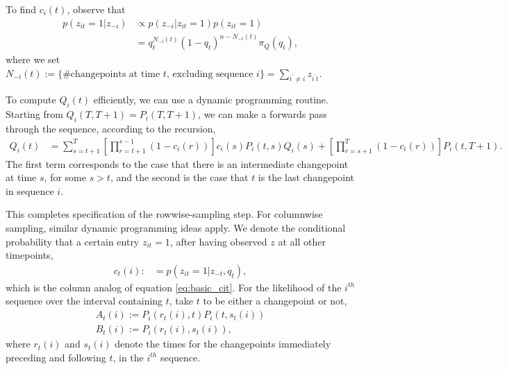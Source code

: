 \documentclass[14pt]{extarticle}
\begin{document}
To find $c_{i}\left(t\right)$, observe that
\begin{align*}
  p\left(z_{it} = 1 \vert z_{-i}\right) &\propto p\left(z_{-i} \vert z_{it} = 1\right) p\left(z_{it} = 1\right) \\
  &= q_{t}^{N_{-i}\left(t\right)} \left(1 - q_{t}\right)^{n - N_{-i}\left(t\right)} \pi_{Q}\left(q_{t}\right),
\end{align*}
where we set $N_{-i}\left(t\right) := \{\# \text{changepoints at time $t$,
excluding sequence } i\} = \sum_{i^\prime \neq i} z_{i^\prime t}$.

To compute $Q_{i}\left(t\right)$ efficiently, we can use a dynamic programming
routine. Starting from $Q_{i}\left(T, T + 1\right) = P_{i}\left(T, T +
1\right)$, we can make a forwards pass through the sequence, according to the
recursion,
\begin{align*}
  Q_{i}\left(t\right) &= \sum_{s = t + 1}^{T} \left[\prod_{r = t + 1}^{s - 1} \left(1 - c_{i}\left(r\right)\right)\right]c_{i}\left(s\right)P_{i}\left(t, s\right)Q_{i}\left(s\right) +
  \left[\prod_{r = s + 1}^{T}\left(1 - c_{i}\left(r\right)\right)\right]P_{i}\left(t, T + 1\right).
\end{align*}
The first term corresponds to the case that there is an intermediate changepoint
at time $s$, for some $s > t$, and the second is the case that $t$ is the last
changepoint in sequence $i$.

This completes specification of the rowwise-sampling step. For columnwise
sampling, similar dynamic programming ideas apply. We denote the
conditional probability that a certain entry $z_{it} = 1$, after having observed
$z$ at all other timepoints,
\begin{align*}
  c_{t}\left(i\right) :&= p\left(z_{it} = 1 \vert z_{-t}, q_{t}\right),
\end{align*}
which is the column analog of equation \ref{eq:basic_cit}. For the likelihood of
the $i^{th}$ sequence over the interval containing $t$, take $t$ to be either a
changepoint or not,
\begin{align*}
  A_{t}\left(i\right) := P_{i}\left(r_{t}\left(i\right), t\right)P_{i}\left(t, s_{t}\left(i\right)\right) \\
  B_{t}\left(i\right) := P_{i}\left(r_{t}\left(i\right), s_{t}\left(i\right)\right),
\end{align*}
where $r_{t}\left(i\right)$ and $s_{t}\left(i\right)$ denote the times for the
changepoints immediately preceding and following $t$, in the $i^{th}$ sequence.
\end{document}
